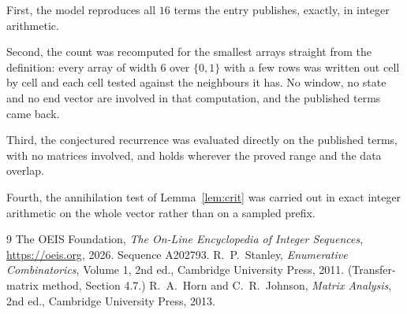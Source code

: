 \documentclass[11pt,a4paper]{article}
\theoremstyle{plain}
\theoremstyle{definition}
\begin{document}
First, the model reproduces all $16$ terms the entry publishes, exactly, in integer
arithmetic.

Second, the count was recomputed for the smallest arrays straight from the definition: every
array of width $6$ over $\{0,1\}$ with a few rows was written out cell by cell and each cell
tested against the neighbours it has. No window, no state and no end vector are involved in that
computation, and the published terms came back.

Third, the conjectured recurrence was evaluated directly on the published terms, with no
matrices involved, and holds wherever the proved range and the data overlap.

Fourth, the annihilation test of Lemma~\ref{lem:crit} was carried out in exact integer
arithmetic on the whole vector rather than on a sampled prefix.

\begin{thebibliography}{9}
 The OEIS Foundation, \emph{The On-Line Encyclopedia of Integer
Sequences}, \url{https://oeis.org}, 2026. Sequence A202793.
 R.~P.~Stanley, \emph{Enumerative Combinatorics}, Volume 1, 2nd ed.,
Cambridge University Press, 2011. (Transfer-matrix method, Section 4.7.)
 R.~A.~Horn and C.~R.~Johnson, \emph{Matrix Analysis}, 2nd ed., Cambridge
University Press, 2013.
\end{thebibliography}
\end{document}
